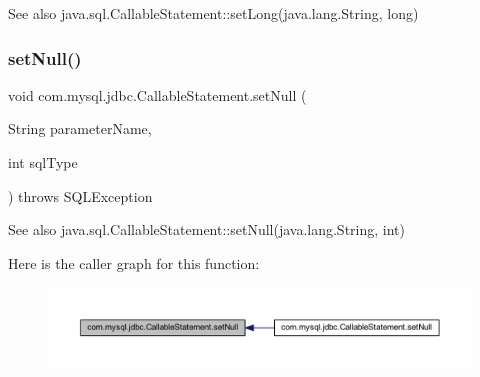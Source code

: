 \begin{DoxySeeAlso}{See also}
java.\+sql.\+Callable\+Statement\+::set\+Long(java.\+lang.\+String, long) 
\end{DoxySeeAlso}
\mbox{\label{classcom_1_1mysql_1_1jdbc_1_1_callable_statement_a93ec882791bb53756dd61ab9a629e027}} 
\subsubsection{\texorpdfstring{set\+Null()}{setNull()}\hspace{0.1cm}{\footnotesize\ttfamily [1/2]}}
{\footnotesize\ttfamily void com.\+mysql.\+jdbc.\+Callable\+Statement.\+set\+Null (\begin{DoxyParamCaption}\item[{String}]{parameter\+Name,  }\item[{int}]{sql\+Type }\end{DoxyParamCaption}) throws S\+Q\+L\+Exception}

\begin{DoxySeeAlso}{See also}
java.\+sql.\+Callable\+Statement\+::set\+Null(java.\+lang.\+String, int) 
\end{DoxySeeAlso}
Here is the caller graph for this function\+:\nopagebreak
\begin{figure}[H]
\begin{center}
\leavevmode
\includegraphics[width=350pt]{classcom_1_1mysql_1_1jdbc_1_1_callable_statement_a93ec882791bb53756dd61ab9a629e027_icgraph}
\end{center}
\end{figure}
\mbox{\label{classcom_1_1mysql_1_1jdbc_1_1_callable_statement_a7b65000fc5f68bdce16ea0f9a609948b}} 
